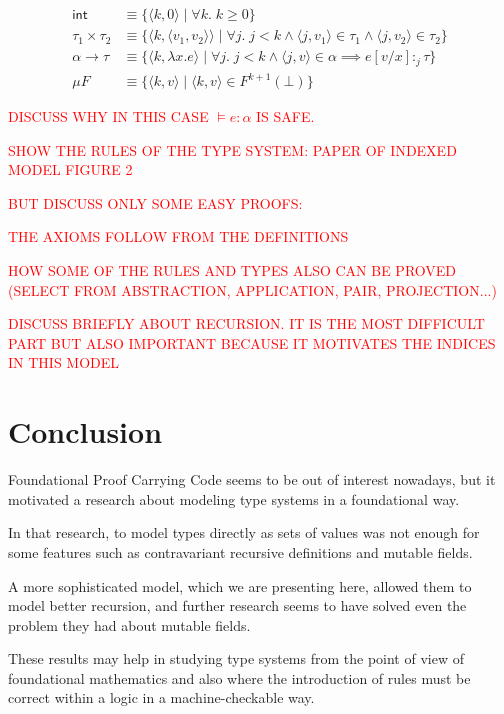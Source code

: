 \documentclass{article}
\begin{document}
\begin{align*}
  \mathsf{int} &\equiv \{ \langle k, 0 \rangle \;|\; 
    \forall k.\;k \geq 0 \} \\
  \tau_1 \times \tau_2 &\equiv 
    \{ \langle k, \langle v_1, v_2 \rangle \rangle \;|\; 
          \forall j.\;j < k \land
          \langle j, v_1\rangle \in \tau_1  \land 
          \langle j, v_2 \rangle \in \tau_2
    \} \\
  \alpha \rightarrow \tau &\equiv 
    \{ \langle k, \lambda x. e \rangle \;|\; 
        \forall j.\;j < k \land
        \langle j, v \rangle \in \alpha \implies
          e[v/x] :_j \tau
    \} \\ 
  \mu F &\equiv 
    \{ \langle k, v \rangle \;|\; \langle k, v \rangle \in 
      F^{k + 1}(\bot)
    \}
\end{align*}

\textcolor{red}{
  DISCUSS WHY IN THIS CASE $\models e : \alpha$ IS SAFE.
}

\textcolor{red}{
  SHOW THE RULES OF THE TYPE SYSTEM: PAPER OF INDEXED MODEL FIGURE 2
}

\textcolor{red}{
  BUT DISCUSS ONLY SOME EASY PROOFS:
}

\textcolor{red}{
  THE AXIOMS FOLLOW FROM THE DEFINITIONS
}

\textcolor{red}{
  HOW SOME OF THE RULES AND TYPES ALSO CAN BE PROVED 
  (SELECT FROM ABSTRACTION, APPLICATION, PAIR, PROJECTION...)
}

\textcolor{red}{
  DISCUSS BRIEFLY ABOUT RECURSION. IT IS THE MOST DIFFICULT PART 
  BUT ALSO IMPORTANT BECAUSE IT MOTIVATES THE INDICES IN THIS MODEL
}

\section*{Conclusion}

Foundational Proof Carrying Code seems to be out of interest 
nowadays, but it motivated a research about modeling type systems 
in a foundational way.

In that research, to model types directly as sets of values was
not enough for some features such as contravariant recursive
definitions and mutable fields.

A more sophisticated model, which we are presenting here, allowed 
them to model better recursion, and further research seems to have 
solved even the problem they had about mutable fields.

These results may help in studying type systems from the point of 
view of foundational mathematics and also where the introduction 
of rules must be correct within a logic in a machine-checkable 
way.
\end{document}
